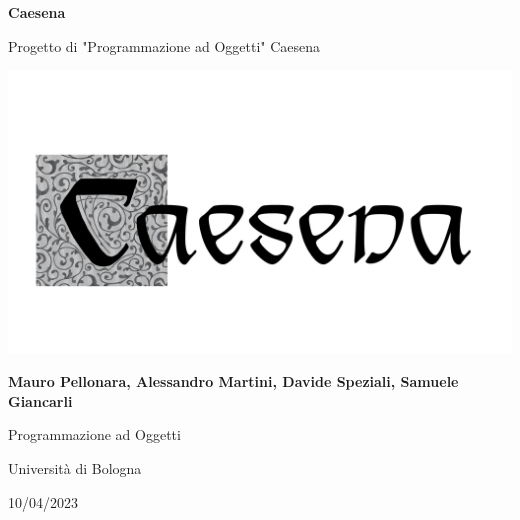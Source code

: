 \documentclass[italian, a4paper, 12pt]{article}
\begin{document}
\begin{titlepage}
    \begin{center}
        \vspace*{1cm}

        \textbf{\Huge Caesena}

        \vspace{1cm}

        {\LARGE Progetto di "Programmazione ad Oggetti" Caesena}

        \vfill

        {\includegraphics[scale=.6]{images/caesena.png}}

        \vfill

        \textbf{\Large Mauro Pellonara, Alessandro Martini, Davide Speziali, Samuele Giancarli}

        \vspace{1cm}

        {\large Programmazione ad Oggetti}

        \vspace{0.3cm}

        {\large Università di Bologna}

        \vspace{0.3cm}

        {\large 10/04/2023}
    \end{center}
\end{titlepage}

\tableofcontents
\newpage


\clearpage

\clearpage

\clearpage

\clearpage

\clearpage

\clearpage

\end{document}
